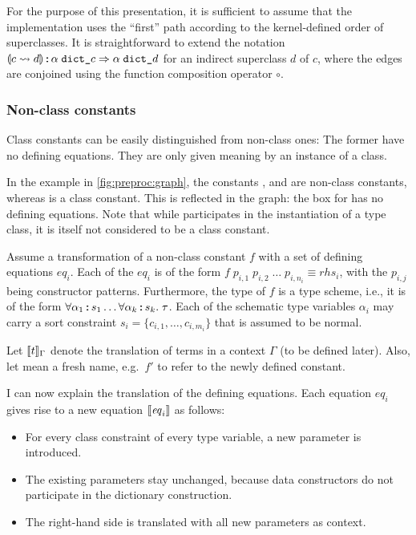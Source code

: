For the purpose of this presentation, it is sufficient to assume that the implementation uses the ``first'' path according to the kernel-defined order of superclasses.
It is straightforward to extend the notation $\llparenthesis c \leadsto d\rrparenthesis \mathbin{:\!\!:} \alpha\;\texttt{\textup{dict\_}}c \Rightarrow \alpha\;\texttt{\textup{dict\_}}d$ for an indirect superclass $d$ of $c$, where the edges are conjoined using the function composition operator $\circ$.

\subsubsection{Non-class constants}

Class constants can be easily distinguished from non-class ones:
The former have no defining equations.
They are only given meaning by an instance of a class.

In the example in \cref{fig:preproc:graph}, the constants ,  and  are non-class constants, whereas  is a class constant.
This is reflected in the graph: the box for  has no defining equations.
Note that while  participates in the instantiation of a type class, it is itself not considered to be a class constant.

Assume a transformation of a non-class constant $f$ with a set of defining equations $\mathit{eq}_i$.
Each of the $\mathit{eq}_i$ is of the form $f\;p_{i,1}\;p_{i,2}\;\ldots\;p_{i,n_i} \equiv \mathit{rhs}_i$, with the $p_{i,j}$ being constructor patterns.
Furthermore, the type of $f$ is a type scheme, i.e., it is of the form $\forall \alpha_1 \mathbin{:\!\!:} s_1 \ldots \forall \alpha_k \mathbin{:\!\!:} s_k.\; \tau$.
Each of the schematic type variables $\alpha_i$ may carry a sort constraint $s_i = \{ c_{i,1}, \ldots, c_{i,m_i} \}$ that is assumed to be normal.

Let $\llbracket t\rrbracket_\Gamma$ denote the translation of terms in a context $\Gamma$ (to be defined later).
Also, let  mean a fresh name, e.g.\ $f'$ to refer to the newly defined constant.

I can now explain the translation of the defining equations.
Each equation $\mathit{eq}_i$ gives rise to a new equation $\llbracket\mathit{eq}_i\rrbracket$ as follows:
\begin{itemize}
  \item For every class constraint of every type variable, a new parameter is introduced.
  \item The existing parameters stay unchanged, because data constructors do not participate in the dictionary construction.
  \item The right-hand side is translated with all new parameters as context.
\end{itemize}

